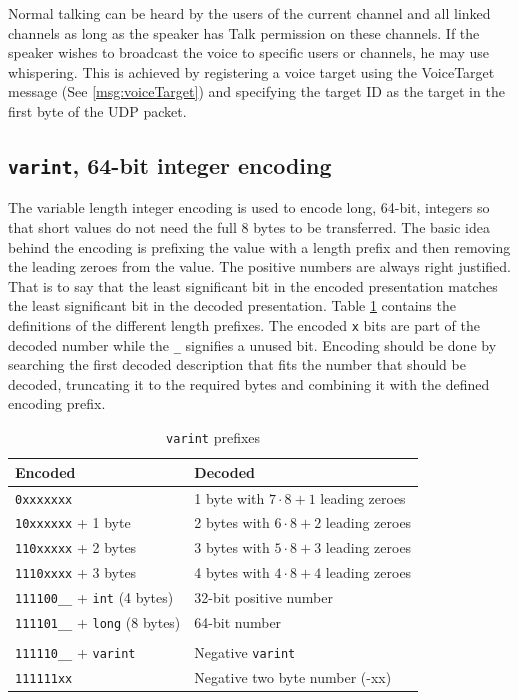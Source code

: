 \documentclass[11pt]{article} %
\begin{document}
Normal talking can be heard by the users of the current channel and all linked channels as long as the speaker has Talk permission on these channels. If the speaker wishes to broadcast the voice to specific users or channels, he may use whispering. This is achieved by registering a voice target using the VoiceTarget message (See \ref{msg:voiceTarget}) and specifying the target ID as the target in the first byte of the UDP packet.

\subsection {\texttt{varint}, 64-bit integer encoding}
\label{sect:varint}

The variable length integer encoding is used to encode long, 64-bit, integers so that short values do not need the full 8 bytes to be transferred. The basic idea behind the encoding is prefixing the value with a length prefix and then removing the leading zeroes from the value. The positive numbers are always right justified. That is to say that the least significant bit in the encoded presentation matches the least significant bit in the decoded presentation. Table \ref{tbl:varint} contains the definitions of the different length prefixes. The encoded \texttt{x} bits are part of the decoded number while the \texttt{\_} signifies a unused bit. Encoding should be done by searching the first decoded description that fits the number that should be decoded, truncating it to the required bytes and combining it with the defined encoding prefix. 

\begin{table}[H]\begin{center}
	\caption{\texttt{varint} prefixes}\label{tbl:varint}

	\begin{tabular}{ll}
		Encoded & Decoded \\
		\hline
		\texttt{0xxxxxxx} & 1 byte with $7 \cdot 8 + 1$ leading zeroes \\
		\texttt{10xxxxxx} + 1 byte & 2 bytes with $6 \cdot 8 + 2$ leading zeroes \\
		\texttt{110xxxxx} + 2 bytes & 3 bytes with $5 \cdot 8 + 3$ leading zeroes \\
		\texttt{1110xxxx} + 3 bytes & 4 bytes with $4 \cdot 8 + 4$ leading zeroes \\
		\texttt{111100\_\_} + \texttt{int} (4 bytes) & 32-bit positive number \\
		\texttt{111101\_\_} + \texttt{long} (8 bytes) & 64-bit number \\
\\
		\texttt{111110\_\_} + \texttt{varint} & Negative \texttt{varint} \\
		\texttt{111111xx} & Negative two byte number (-xx) \\
	\end{tabular}
\end{center}\end{table}
\end{document}
